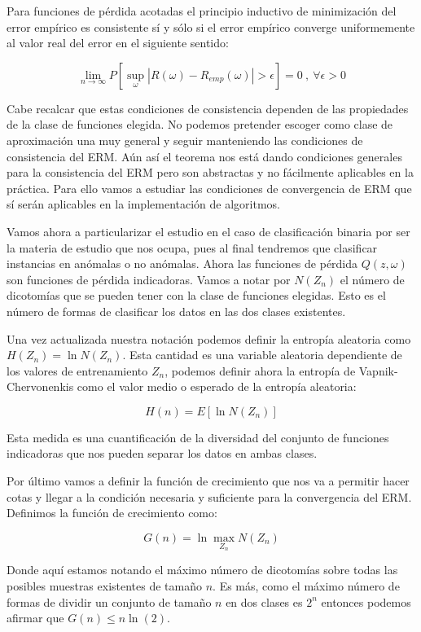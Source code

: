 \begin{teorema}
	Para funciones de pérdida acotadas el principio inductivo de minimización del error empírico es consistente sí y sólo si el error empírico converge uniformemente al valor real del error en el siguiente sentido:
	
	$$\lim\limits_{n\rightarrow \infty} P[\sup_{\omega}|R(\omega) - R_{emp}(\omega)|>\epsilon] = 0 \ , \ \forall \epsilon >0$$
\end{teorema}

Cabe recalcar que estas condiciones de consistencia dependen de las propiedades de la clase de funciones elegida. No podemos pretender escoger como clase de aproximación una muy general y seguir manteniendo las condiciones de consistencia del ERM. Aún así el teorema nos está dando condiciones generales para la consistencia del ERM pero son abstractas y no fácilmente aplicables en la práctica. Para ello vamos a estudiar las condiciones de convergencia de ERM que sí serán aplicables en la implementación de algoritmos.

Vamos ahora a particularizar el estudio en el caso de clasificación binaria por ser la materia de estudio que nos ocupa, pues al final tendremos que clasificar instancias en anómalas o no anómalas. Ahora las funciones de pérdida $Q(z,\omega)$ son funciones de pérdida indicadoras. Vamos a notar por $N(Z_n)$ el número de dicotomías que se pueden tener con la clase de funciones elegidas. Esto es el número de formas de clasificar los datos en las dos clases existentes.

Una vez actualizada nuestra notación podemos definir la entropía aleatoria como $H(Z_n) = \ln N(Z_n)$. Esta cantidad es una variable aleatoria dependiente de los valores de entrenamiento $Z_n$, podemos definir ahora la entropía de Vapnik-Chervonenkis como el valor medio o esperado de la entropía aleatoria:

$$H(n) = E[\ln N(Z_n)]$$

Esta medida es una cuantificación de la diversidad del conjunto de funciones indicadoras que nos pueden separar los datos en ambas clases.

Por último vamos a definir la función de crecimiento que nos va a permitir hacer cotas y llegar a la condición necesaria y suficiente para la convergencia del ERM. Definimos la función de crecimiento como:

$$G(n) = \ln \max_{Z_n} N(Z_n)$$

Donde aquí estamos notando el máximo número de dicotomías sobre todas las posibles muestras existentes de tamaño $n$. Es más, como el máximo número de formas de dividir un conjunto de tamaño $n$ en dos clases es $2^n$ entonces podemos afirmar que $G(n)\leq n\ln (2)$.

